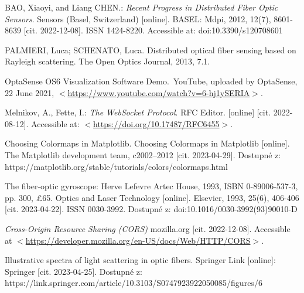 \begin{thebibliography}{99}
BAO, Xiaoyi, and Liang CHEN.: \emph{Recent Progress in Distributed Fiber Optic Sensors}. Sensors (Basel, Switzerland) [online]. BASEL: Mdpi, 2012, 12(7), 8601-8639 [cit. 2022-12-08]. ISSN 1424-8220. Accessible at: doi:10.3390/s120708601

PALMIERI, Luca; SCHENATO, Luca. Distributed optical fiber sensing based on Rayleigh scattering. The Open Optics Journal, 2013, 7.1.

OptaSense OS6 Visualization Software Demo. YouTube, uploaded by OptaSense, 22 June 2021, \(<\)\url{https://www.youtube.com/watch?v=6-hj1ySERIA}\(>\).

Melnikov, A., Fette, I.: \emph{The WebSocket Protocol}. RFC Editor. [online] [cit. 2022-08-12]. Accessible at: \(<\)\url{https://doi.org/10.17487/RFC6455}\(>\).

Choosing Colormaps in Matplotlib. Choosing Colormaps in Matplotlib [online]. The Matplotlib development team, c2002–2012 [cit. 2023-04-29]. Dostupné z: https://matplotlib.org/stable/tutorials/colors/colormaps.html


The fiber-optic gyroscope: Herve Lefevre Artec House, 1993, ISBN 0-89006-537-3, pp. 300, £65. Optics and Laser Technology [online]. Elsevier, 1993, 25(6), 406-406 [cit. 2023-04-22]. ISSN 0030-3992. Dostupné z: doi:10.1016/0030-3992(93)90010-D


\emph{Cross-Origin Resource Sharing (CORS)} mozilla.org [cit. 2022-12-08]. Accessible at \(<\)\url{https://developer.mozilla.org/en-US/docs/Web/HTTP/CORS}\(>\).

Illustrative spectra of light scattering in optic fibers. Springer Link [online]: Springer [cit. 2023-04-25]. Dostupné z: https://link.springer.com/article/10.3103/S0747923922050085/figures/6







\end{thebibliography}
